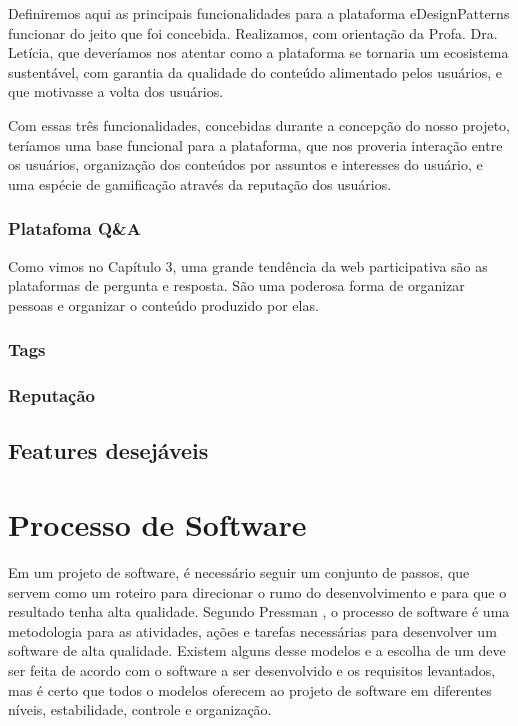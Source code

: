 Definiremos aqui as principais funcionalidades para a plataforma eDesignPatterns funcionar do jeito que foi concebida. Realizamos, com orientação da Profa. Dra. Letícia, que deveríamos nos atentar como a plataforma se tornaria um ecosistema sustentável, com garantia da qualidade do conteúdo alimentado pelos usuários, e que motivasse a volta dos usuários.

Com essas três funcionalidades, concebidas durante a concepção do nosso projeto, teríamos uma base funcional para a plataforma, que nos proveria interação entre os usuários, organização dos conteúdos por assuntos e interesses do usuário, e uma espécie de gamificação através da reputação dos usuários.

\subsubsection{Platafoma Q\&A}
Como vimos no Capítulo 3, uma grande tendência da web participativa são as  plataformas de pergunta e resposta. São uma poderosa forma de organizar pessoas e organizar o conteúdo produzido por elas.  
\subsubsection{Tags}

\subsubsection{Reputação}

\subsection{Features desejáveis}


\section{Processo de Software}

Em um projeto de software, é necessário seguir um conjunto de passos, que servem como um roteiro para direcionar o rumo do desenvolvimento e para que o resultado tenha alta qualidade. Segundo Pressman \cite{pressman2016engenharia}, o processo de software é uma metodologia para as atividades, ações e tarefas necessárias para desenvolver um software de alta qualidade. Existem alguns desse modelos e a escolha de um deve ser feita de acordo com o software a ser desenvolvido e os requisitos levantados, mas é certo que todos o modelos oferecem ao projeto de software em diferentes níveis, estabilidade, controle e organização.

